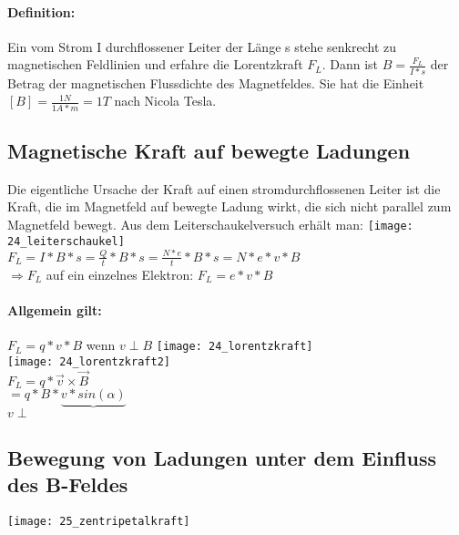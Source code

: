 \documentclass[12pt]{scrartcl}
\begin{document}
\begin{flushleft}
		\paragraph{Definition:} Ein vom Strom I durchflossener Leiter der Länge s stehe senkrecht zu magnetischen Feldlinien und erfahre die Lorentzkraft $F_L$. Dann ist $B = \frac{F_L}{I \ast s}$ der Betrag der magnetischen Flussdichte des Magnetfeldes. Sie hat die Einheit $ [B] = \frac{1N}{1A \ast m} = 1T$ nach Nicola Tesla.
		
		\subsection{Magnetische Kraft auf bewegte Ladungen}
		Die eigentliche Ursache der Kraft auf einen stromdurchflossenen Leiter ist die Kraft, die im Magnetfeld auf bewegte Ladung wirkt, die sich nicht parallel zum Magnetfeld bewegt. Aus dem Leiterschaukelversuch erhält man:
		\texttt{[image: 24\_leiterschaukel]}
		\vspace{3mm} \\
		$F_L = I \ast B \ast s = \frac{Q}{t} \ast B \ast s = \frac{N \ast e}{t} \ast B \ast s = N \ast e \ast v \ast B$
		\vspace{3mm} \\
		$ \Rightarrow F_L $ auf ein einzelnes Elektron: $ F_L = e \ast v \ast B $
		
		\newpage
		
		\paragraph{Allgemein gilt:} $F_L = q \ast v \ast B $ \hspace{2mm} wenn \hspace{2mm} $ v \perp B $
		\texttt{[image: 24\_lorentzkraft]} \\
		\texttt{[image: 24\_lorentzkraft2]} \\
		$ F_L = q \ast \vec{v} \times \vec{B} $
		\vspace{1mm} \\
		$= q \ast B \ast \underbrace{v \ast sin(\alpha)} $ \\
		\hspace{22.5mm} $ v \perp $
		
		\subsection{Bewegung von Ladungen unter dem Einfluss des B-Feldes}
		\texttt{[image: 25\_zentripetalkraft]}
		

\end{flushleft}
\end{document}
